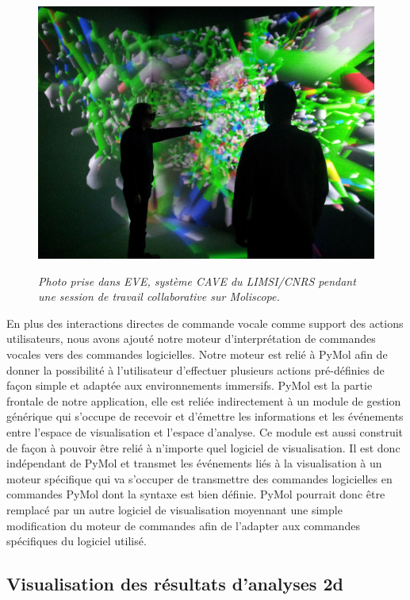 \begin{figure}
  \centering
  {\includegraphics[width=.75\linewidth]{./figures/ch5/multi_collaboratif}}
    \caption{{\it Photo prise dans EVE, système CAVE du LIMSI/CNRS pendant une session de travail collaborative sur Moliscope.}}
  \label{Fig:multi_collaboratif}
  \hspace{0.3cm}
\end{figure}

En plus des interactions directes de commande vocale comme support des actions utilisateurs, nous avons ajouté notre moteur d'interprétation de commandes vocales vers des commandes logicielles. Notre moteur est relié à PyMol afin de donner la possibilité à l'utilisateur d'effectuer plusieurs actions pré-définies de façon simple et adaptée aux environnements immersifs.
PyMol est la partie frontale de notre application, elle est reliée indirectement à un module de gestion générique qui s'occupe de recevoir et d'émettre les informations et les événements entre l'espace de visualisation et l'espace d'analyse. Ce module est aussi construit de façon à pouvoir être relié à n'importe quel logiciel de visualisation. Il est donc indépendant de PyMol et transmet les événements liés à la visualisation à un moteur spécifique qui va s'occuper de transmettre des commandes logicielles en commandes PyMol dont la syntaxe est bien définie. PyMol pourrait donc être remplacé par un autre logiciel de visualisation moyennant une simple modification du moteur de commandes afin de l'adapter aux commandes spécifiques du logiciel utilisé.

\subsection{Visualisation des résultats d'analyses 2d}

